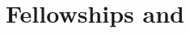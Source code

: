 \documentclass[letterpaper]{deedy-resume} %
\begin{document}
\begin{minipage}[t]{0.33\textwidth}







\vspace{25pt}

\section{Fellowships and}\vspace{-5pt}

\end{minipage}
\end{document}

